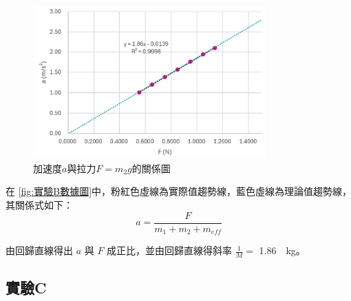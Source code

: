\documentclass[11pt,a4paper]{article}
\theoremstyle{definition}
\begin{document}
            \begin{figure}[H]
                
                \centering
                \includegraphics[width=0.8\textwidth]{實驗B數據圖.png}
                \caption{加速度$\displaystyle{a}$與拉力$F = m_2 g$的關係圖}
                \label{fig:實驗B數據圖}

            \end{figure}            

            在 \autoref{fig:實驗B數據圖}中，粉紅色虛線為實際值趨勢線，藍色虛線為理論值趨勢線，其關係式如下：
            \begin{equation}
                a = \frac{F}{m_1 + m_2 + m_{eff}} \label{eq:theory_B}
            \end{equation}

            \par 由回歸直線得出
            $a$ 與 $F$ 成正比，並由回歸直線得斜率 $\displaystyle{\frac{1}{M}} = $ \SI{1.86}{\per\kilogram}。

        \subsection{實驗C}
\end{document}
